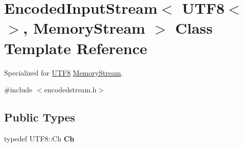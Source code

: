\hypertarget{classEncodedInputStream_3_01UTF8_3_4_00_01MemoryStream_01_4}{}\section{Encoded\+Input\+Stream$<$ U\+T\+F8$<$$>$, Memory\+Stream $>$ Class Template Reference}
\label{classEncodedInputStream_3_01UTF8_3_4_00_01MemoryStream_01_4}


Specialized for \hyperlink{structUTF8}{U\+T\+F8} \hyperlink{structMemoryStream}{Memory\+Stream}.  




{\ttfamily \#include $<$encodedstream.\+h$>$}

\subsection*{Public Types}
\begin{DoxyCompactItemize}
\item 
typedef U\+T\+F8\+::\+Ch {\bfseries Ch}\hypertarget{classEncodedInputStream_3_01UTF8_3_4_00_01MemoryStream_01_4_a091eb31dd2554bf10054148953f9b3bf}{}\label{classEncodedInputStream_3_01UTF8_3_4_00_01MemoryStream_01_4_a091eb31dd2554bf10054148953f9b3bf}

\end{DoxyCompactItemize}
